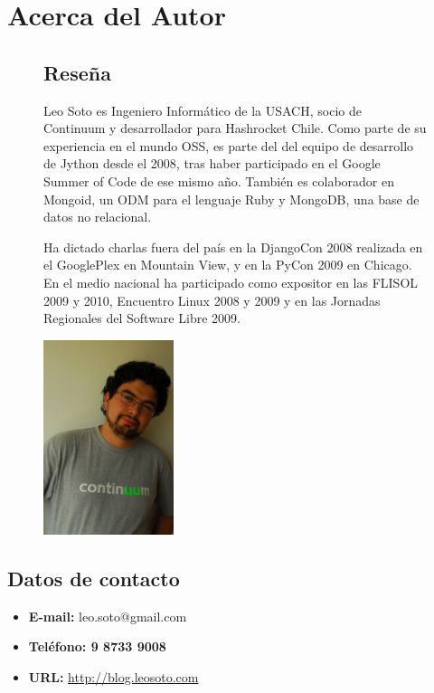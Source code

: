 \section{Acerca del Autor}

\begin{figure}[h]
\begin{minipage}{11.5cm}

\subsection{Reseña}

Leo Soto es Ingeniero Informático de la USACH, socio de Continuum y
desarrollador para Hashrocket Chile. Como parte de su experiencia en el mundo
OSS, es parte del del equipo de desarrollo de Jython desde el 2008, tras haber
participado en el Google Summer of Code de ese mismo año. También es colaborador
en Mongoid, un ODM para el lenguaje Ruby y MongoDB, una base de datos no
relacional.

Ha dictado charlas fuera del país en la DjangoCon 2008 realizada en el
GooglePlex en Mountain View, y en la PyCon 2009 en Chicago. En el medio nacional
ha participado como expositor en las FLISOL 2009 y 2010, Encuentro Linux 2008 y
2009 y en las Jornadas Regionales del Software Libre 2009.

\end{minipage}
\begin{minipage}{1.7in}
\includegraphics[width=1.5in]{images/foto.jpg}
\end{minipage}
\end{figure}

\subsection{Datos de contacto}

\begin{itemize}
\item{\textbf{E-mail:} leo.soto@gmail.com}
\item\textbf{{Teléfono:} 9 8733 9008}
\item{\textbf{URL:} \url{http://blog.leosoto.com}}
\end{itemize}
